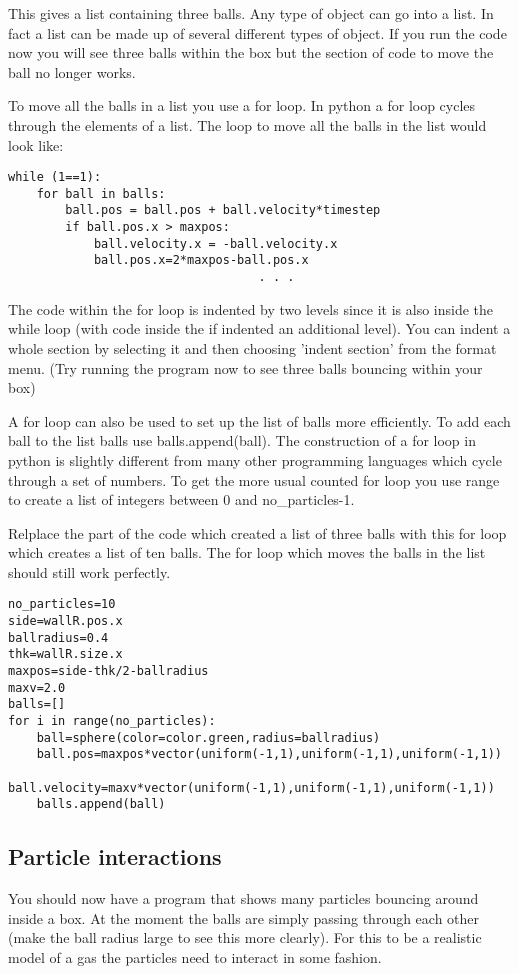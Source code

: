 \documentclass[a4paper]{letter}
\begin{document}
This gives a list containing three balls. Any type of object can go into a list. 
In fact a list can be made up of several different types of object. 
If you run the code now you will see three balls within the box but the section 
of code to move the ball no longer works.

To move all the balls in a list you use a {\color{code}for} loop. 
In python a {\color{code}for} loop cycles through the elements of a list.
The loop to move all the balls in the list would look like:
{\color{code}\begin{verbatim}
while (1==1): 
    for ball in balls: 
        ball.pos = ball.pos + ball.velocity*timestep 
        if ball.pos.x > maxpos: 
            ball.velocity.x = -ball.velocity.x 
            ball.pos.x=2*maxpos-ball.pos.x 
                                   . . . 
\end{verbatim}}
The code within the for loop is indented by two levels 
since it is also inside the while loop (with code inside the if indented an additional level). 
You can indent a whole section by selecting it and then choosing 'indent section' 
from the format menu.
(Try running the program now to see three balls bouncing within your box)

A for loop can also be used to set up the list of balls more efficiently. 
To add each ball to the list {\color{code}balls} use {\color{code}balls.append(ball)}.
The construction of a for loop in python is slightly different from many 
other programming languages which cycle through a set of numbers. 
To get the more usual counted for loop you use {\color{code}range} to create a 
list of integers between 0 and {\color{code}no\_particles-1}.

Relplace the part of the code which created a list of three balls with this for loop 
which creates a list of ten balls. 
The for loop which moves the balls in the list should still work perfectly.  
{\color{code}\begin{verbatim}
no_particles=10 
side=wallR.pos.x
ballradius=0.4
thk=wallR.size.x
maxpos=side-thk/2-ballradius 
maxv=2.0 
balls=[]
for i in range(no_particles): 
    ball=sphere(color=color.green,radius=ballradius) 
    ball.pos=maxpos*vector(uniform(-1,1),uniform(-1,1),uniform(-1,1)) 
    ball.velocity=maxv*vector(uniform(-1,1),uniform(-1,1),uniform(-1,1)) 
    balls.append(ball) 
\end{verbatim}}

\subsection{Particle interactions}
You should now have a program that shows many particles bouncing around inside a box. 
At the moment the balls are simply passing through each other 
(make the ball radius large to see this more clearly). 
For this to be a realistic model of a gas the particles need to interact in some fashion. 
\end{document}
